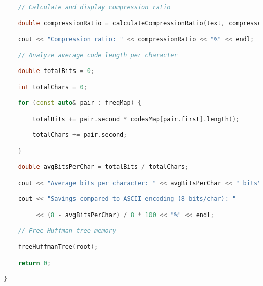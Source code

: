 \begin{lstlisting}[language=C++]
    // Calculate and display compression ratio

    double compressionRatio = calculateCompressionRatio(text, compressed);

    cout << "Compression ratio: " << compressionRatio << "%" << endl;

    // Analyze average code length per character

    double totalBits = 0;

    int totalChars = 0;

    for (const auto& pair : freqMap) {

        totalBits += pair.second * codesMap[pair.first].length();

        totalChars += pair.second;

    }

    double avgBitsPerChar = totalBits / totalChars;

    cout << "Average bits per character: " << avgBitsPerChar << " bits" << endl;

    cout << "Savings compared to ASCII encoding (8 bits/char): "

         << (8 - avgBitsPerChar) / 8 * 100 << "%" << endl;

    // Free Huffman tree memory

    freeHuffmanTree(root);

    return 0;

}
\end{lstlisting}